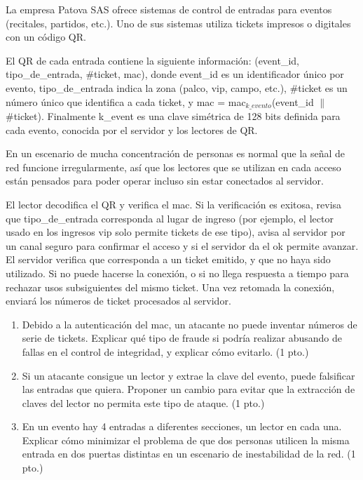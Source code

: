 \begin{consigna}
La empresa Patova SAS ofrece sistemas de control de entradas para eventos (recitales,
partidos, etc.). Uno de sus sistemas utiliza tickets impresos o digitales con un código QR.

El QR de cada entrada contiene la siguiente información: (event\_id, tipo\_de\_entrada,
\#ticket, mac), donde event\_id es un identificador único por evento, tipo\_de\_entrada
indica la zona (palco, vip, campo, etc.), \#ticket es un número único que identifica a
cada ticket, y mac = mac$_{k\_evento}$(event\_id $\|$ \#ticket). Finalmente k\_event es una
clave simétrica de 128 bits definida para cada evento, conocida por el servidor y los
lectores de QR.

En un escenario de mucha concentración de personas es normal que la señal de red funcione
irregularmente, así que los lectores que se utilizan en cada acceso están pensados para
poder operar incluso sin estar conectados al servidor.

El lector decodifica el QR y verifica el mac. Si la verificación es exitosa, revisa que
tipo\_de\_entrada corresponda al lugar de ingreso (por ejemplo, el lector usado en los
ingresos vip solo permite tickets de ese tipo), avisa al servidor por un canal seguro para
confirmar el acceso y si el servidor da el ok permite avanzar. El servidor verifica que
corresponda a un ticket emitido, y que no haya sido utilizado. Si no puede hacerse la
conexión, o si no llega respuesta a tiempo para rechazar usos subsiguientes del mismo
ticket. Una vez retomada la conexión, enviará los números de ticket procesados al servidor.

\begin{enumerate}
  \item[a)] Debido a la autenticación del mac, un atacante no puede inventar números de serie de
  tickets. Explicar qué tipo de fraude si podría realizar abusando de fallas en el control de
  integridad, y explicar cómo evitarlo. (1 pto.)
  \item[b)] Si un atacante consigue un lector y extrae la clave del evento, puede falsificar las
  entradas que quiera. Proponer un cambio para evitar que la extracción de claves del lector no
  permita este tipo de ataque. (1 pto.)
  \item[c)] En un evento hay 4 entradas a diferentes secciones, un lector en cada una. Explicar
  cómo minimizar el problema de que dos personas utilicen la misma entrada en dos puertas
  distintas en un escenario de inestabilidad de la red. (1 pto.)
\end{enumerate}
\end{consigna}

